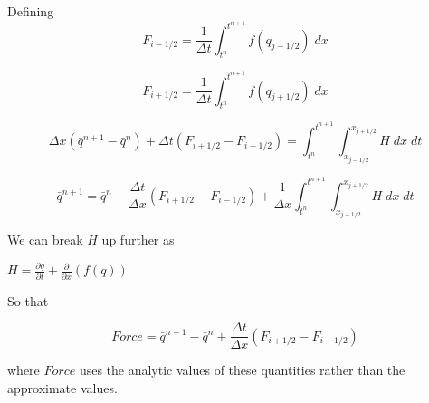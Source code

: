 \documentclass[12pt]{article}
\begin{document}
Defining $$F_{i -1/2}= \frac{1}{\Delta t} \int_{t^n}^{t^{n+1}} f(q_{j-1/2})\; dx$$

$$F_{i + 1/2}= \frac{1}{\Delta t} \int_{t^n}^{t^{n+1}} f(q_{j+1/2})\; dx$$

\begin{equation}
\Delta x \left(\bar{q}^{n+1} - \bar{q}^n  \right) +  \Delta t\left(F_{i + 1/2} - F_{i -1/2}\right)  =   \int_{t^n}^{t^{n+1}} \int_{x_{j-1/2}}^{x_{j+1/2}} H \; dx \; dt
\end{equation}

\begin{equation}
\bar{q}^{n+1} =  \bar{q}^n  - \frac{\Delta t}{\Delta x} \left(F_{i + 1/2} - F_{i -1/2}\right)  +     \frac{1}{\Delta x}\int_{t^n}^{t^{n+1}} \int_{x_{j-1/2}}^{x_{j+1/2}} H \; dx \; dt
\end{equation}

We can break $H$ up further as

$H = \frac{\partial q}{\partial t} + \frac{\partial}{\partial x}\left(f(q)\right)$

So that 

$$Force = \bar{q}^{n+1} -  \bar{q}^n  + \frac{\Delta t}{\Delta x} \left(F_{i + 1/2} - F_{i -1/2}\right)  $$


where $Force$ uses the analytic values of these quantities rather than the approximate values.
 
\end{document}
